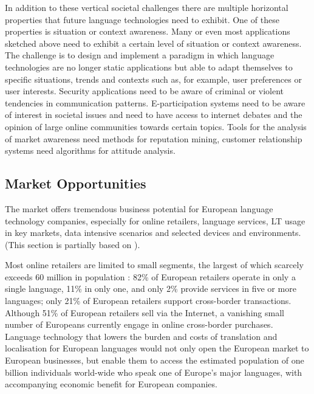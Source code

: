 \documentclass[10pt, plain]{../../metanetpaper}
\begin{document}
\begin{multicols}{2}
In addition to these vertical societal challenges there are multiple horizontal properties that future language technologies need to exhibit. One of these properties is situation or context awareness. Many or even most applications sketched above need to exhibit a certain level of situation or context awareness. The challenge is to design and implement a paradigm in which language technologies are no longer static applications but able to adapt themselves to specific situations, trends and contexts such as, for example, user preferences or user interests. Security applications need to be aware of criminal or violent tendencies in communication patterns. E-participation systems need to be aware of interest in societal issues and need to have access to internet debates and the opinion of large online communities towards certain topics. Tools for the analysis of market awareness need methods for reputation mining, customer relationship systems need algorithms for attitude analysis.

\subsection{Market Opportunities}
\label{sec:market-opportunities}


The market offers tremendous business potential for European language technology companies, especially for online retailers, language services, LT usage in key markets, data intensive scenarios and selected devices and environments. (This section is partially based on \cite{lti2012}).

Most online retailers are limited to small segments, the largest of which scarcely exceeds 60 million in population \cite{iws2012}: 82\% of European retailers operate in only a single language, 11\% in only one, and only 2\% provide services in five or more languages; only 21\% of European retailers support cross-border transactions. Although 51\% of European retailers sell via the Internet, a vanishing small number of Europeans currently engage in online cross-border purchases. Language technology that lowers the burden and costs of translation and localisation for European languages would not only open the European market to European businesses, but enable them to access the estimated population of one billion individuals world-wide who speak one of Europe’s major languages, with accompanying economic benefit for European companies.


\end{multicols}
\end{document}
